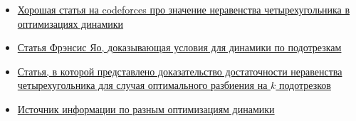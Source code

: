 \begin{itemize}

    \item \href{https://codeforces.com/blog/entry/86306}{Хорошая статья на codeforces про значение неравенства четырехугольника в оптимизациях динамики}

    \item \href{https://cse.hkust.edu.hk/mjg_lib/bibs/DPSu/DPSu.Files/p429-yao.pdf}{Статья Фрэнсис Яо, доказывающая условия для динамики по подотрезкам}

    \item \href{https://cse.hkust.edu.hk/mjg_lib/bibs/DPSu/DPSu.Files/sdarticle_204.pdf}{Статья, в которой представлено доказательство достаточности неравенства четырехугольника для случая оптимального разбиения на $k$ подотрезков}

    \item \href{https://codeforces.com/blog/entry/8219}{Источник информации по разным оптимизациям динамики}
\end{itemize}

